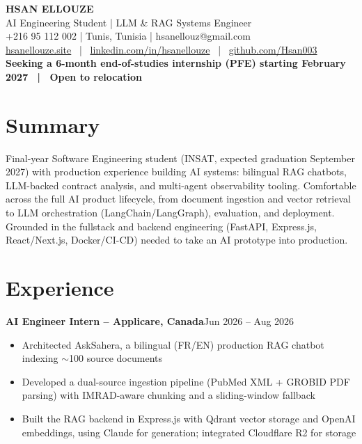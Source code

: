 \documentclass[10pt,a4paper]{article}
\newcommand{\entry}[2]{\vspace{1pt}\noindent\textbf{#1}\hfill{\color{muted}#2}\par}
\begin{document}
\begin{center}
  {\LARGE\bfseries HSAN ELLOUZE}\\[2pt]
  {\color{muted} AI Engineering Student | LLM \& RAG Systems Engineer}\\[2pt]
  {\footnotesize +216 95 112 002 | Tunis, Tunisia | hsanellouz@gmail.com}\\[1pt]
  {\footnotesize \href{https://hsanellouze.site}{hsanellouze.site} \ | \ \href{https://linkedin.com/in/hsanellouze}{linkedin.com/in/hsanellouze} \ | \ \href{https://github.com/Hsan003}{github.com/Hsan003}}\\[3pt]
  {\footnotesize\bfseries Seeking a 6-month end-of-studies internship (PFE) starting February 2027 \ | \ Open to relocation}
\end{center}

\section{Summary}
Final-year Software Engineering student (INSAT, expected graduation September 2027) with production experience building AI systems: bilingual RAG chatbots, LLM-backed contract analysis, and multi-agent observability tooling. Comfortable across the full AI product lifecycle, from document ingestion and vector retrieval to LLM orchestration (LangChain/LangGraph), evaluation, and deployment. Grounded in the fullstack and backend engineering (FastAPI, Express.js, React/Next.js, Docker/CI-CD) needed to take an AI prototype into production.

\section{Experience}
\entry{AI Engineer Intern -- Applicare, Canada}{Jun 2026 -- Aug 2026}
\begin{itemize}
  \item Architected AskSahera, a bilingual (FR/EN) production RAG chatbot indexing $\sim$100 source documents
  \item Developed a dual-source ingestion pipeline (PubMed XML + GROBID PDF parsing) with IMRAD-aware chunking and a sliding-window fallback
  \item Built the RAG backend in Express.js with Qdrant vector storage and OpenAI embeddings, using Claude for generation; integrated Cloudflare R2 for storage
\end{itemize}
\end{document}
